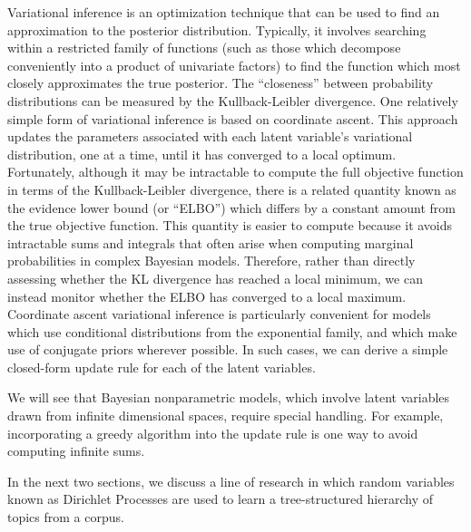 \documentclass{article}
\begin{document}
Variational inference is an optimization technique that can be used to find an approximation to the posterior distribution.
Typically, it involves searching within a restricted family of functions (such as those which decompose conveniently into a product of univariate factors) to find the function which most closely approximates the true posterior.
The ``closeness'' between probability distributions can be measured by the Kullback-Leibler divergence.
One relatively simple form of variational inference is based on coordinate ascent.
This approach updates the parameters associated with each latent variable's variational distribution, one at a time, until it has converged to a local optimum.
Fortunately, although it may be intractable to compute the full objective function in terms of the Kullback-Leibler divergence, there is a related quantity known as the evidence lower bound (or ``ELBO'') which differs by a constant amount from the true objective function.
This quantity is easier to compute because it avoids intractable sums and integrals that often arise when computing marginal probabilities in complex Bayesian models.
Therefore, rather than directly assessing whether the KL divergence has reached a local minimum, we can instead monitor whether the ELBO has converged to a local maximum.
Coordinate ascent variational inference is particularly convenient for models which use conditional distributions from the exponential family, and which make use of conjugate priors wherever possible.
In such cases, we can derive a simple closed-form update rule for each of the latent variables.

We will see that Bayesian nonparametric models, which involve latent variables drawn from infinite dimensional spaces, require special handling.
For example, incorporating a greedy algorithm into the update rule is one way to avoid computing infinite sums.


In the next two sections, we discuss a line of research in which random variables known as Dirichlet Processes are used to learn a tree-structured hierarchy of topics from a corpus.
\end{document}
